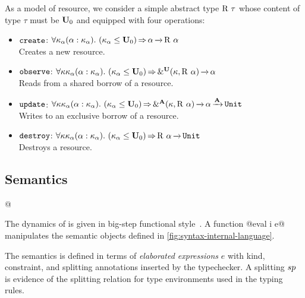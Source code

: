 As a model of resource, we consider a simple abstract
type $\tapp{\tres}{\tau}$ whose content of type $\tau$ must be $\kun_0$ and
equipped with four operations:
\begin{itemize}
\item
$\create$:
$\forall{\kvar_\tvar}\bvar{\tvar}{\kvar_\tvar}.\
\qual{\Cleq {\kvar_\tvar} {\kun_0}}
{\tvar \tarr{} \tapp\tres\tvar}$\\
Creates a new resource.

\item
$\observe$:
$\forall{\kvar\kvar_\tvar}\bvar{\tvar}{\kvar_\tvar}.\
\qual{\Cleq {\kvar_\tvar} {\kun_0}}
{\borrowty[\IBORROW]{\kvar}{\tapp\tres\tvar} \tarr{} \tvar}$\\
Reads from a shared borrow of a resource.

\item
$\update$:
$\forall{\kvar\kvar_\tvar}\bvar{\tvar}{\kvar_\tvar}.\
\qual{\Cleq {\kvar_\tvar} {\kun_0}}
\borrowty[\MBORROW]{\kvar}{\tapp\tres\tvar} \tarr{} \tvar \tarr{\kaff} \tunit$\\
Writes to an exclusive borrow of a resource.

\item
$\destroy$:
$\forall{\kvar\kvar_\tvar}\bvar{\tvar}{\kvar_\tvar}.\
\qual{\Cleq {\kvar_\tvar} {\kun_0}}
\tapp\tres\tvar \tarr{} \tunit$\\
Destroys a resource.
\end{itemize}

\subsection{Semantics}
\label{sec:sem}


\lstMakeShortInline[style=rule,basicstyle=\normalsize\normalfont]@

The dynamics of \lang is given in big-step
functional
style~\cite{siek13:_type_safet_three_easy_lemmas,DBLP:conf/esop/OwensMKT16,
  DBLP:conf/popl/AminR17}.  A function
@eval \Store \Perm \VEnv i e@
manipulates the semantic objects defined in
\cref{fig:syntax-internal-language}.

The semantics is defined in terms of \emph{elaborated expressions} $e$
with kind, constraint, and splitting annotations inserted by the typechecker.
A splitting $\Sp$ is evidence of the splitting relation for type environments
used in the typing rules.

